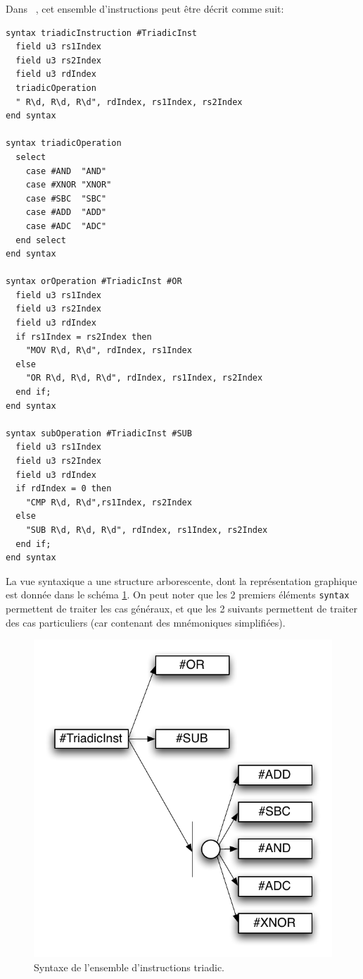 Dans  \harmless\ , cet ensemble d'instructions peut être décrit comme suit:
 
\begin{lstlisting}
syntax triadicInstruction #TriadicInst 
  field u3 rs1Index
  field u3 rs2Index
  field u3 rdIndex
  triadicOperation
  " R\d, R\d, R\d", rdIndex, rs1Index, rs2Index
end syntax

syntax triadicOperation 
  select
    case #AND  "AND"
    case #XNOR "XNOR"
    case #SBC  "SBC"
    case #ADD  "ADD"
    case #ADC  "ADC"
  end select
end syntax

syntax orOperation #TriadicInst #OR
  field u3 rs1Index
  field u3 rs2Index
  field u3 rdIndex
  if rs1Index = rs2Index then
    "MOV R\d, R\d", rdIndex, rs1Index
  else
    "OR R\d, R\d, R\d", rdIndex, rs1Index, rs2Index
  end if;
end syntax

syntax subOperation #TriadicInst #SUB
  field u3 rs1Index
  field u3 rs2Index
  field u3 rdIndex
  if rdIndex = 0 then
    "CMP R\d, R\d",rs1Index, rs2Index
  else
    "SUB R\d, R\d, R\d", rdIndex, rs1Index, rs2Index
  end if;
end syntax

\end{lstlisting}

La vue syntaxique a une structure arborescente, dont la représentation graphique est donnée dans le schéma \ref{fig:TriadicInst}. On peut noter que les 2 premiers éléments \texttt{syntax} permettent de traiter les cas généraux, et que les 2 suivants permettent de traiter des cas particuliers (car contenant des mnémoniques simplifiées).

\begin{figure}		
  \begin{center}
    \includegraphics[width=0.5 \linewidth]{../common/images/TriadicInst.pdf}
    \caption{Syntaxe de l'ensemble d'instructions triadic.}
    \label{fig:TriadicInst}
  \end{center}
\end{figure}
